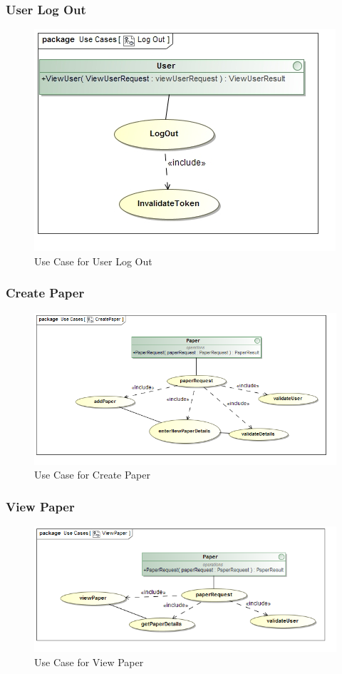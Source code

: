 \documentclass[a4paper,10pt]{article}
\begin{document}
\subsubsection{User Log Out}
	\begin{figure}[H]
		\includegraphics[scale=0.5]{UseLogOut}
	\caption{Use Case for User Log Out}
	\end{figure}
	
\subsubsection{Create Paper}
	\begin{figure}[H]
		\includegraphics[scale=0.5]{Use_CreatePaper}
	\caption{Use Case for Create Paper}
	\end{figure}


\subsubsection{View Paper}
	\begin{figure}[H]
		\includegraphics[scale=0.5]{Use_ViewPaper}
	\caption{Use Case for View Paper}
	\end{figure}
\end{document}
